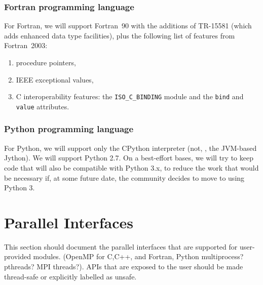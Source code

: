 \documentclass[draftmode,draftwater]{memarticle}
\begin{document}
\subsubsection{Fortran programming language}

For Fortran, we will support Fortran~90 with the additions of TR-15581
(which adds enhanced data type facilities), plus the following list of
features from Fortran~2003:
\begin{enumerate}
\item procedure pointers,
\item IEEE exceptional values,
\item C interoperability features: the \texttt{ISO\_C\_BINDING} module
  and the \texttt{bind} and \texttt{value} attributes.
\end{enumerate}

\subsubsection{Python programming language}

For Python, we will support only the CPython interpreter (not, \eg, the
JVM-based Jython). We will support Python 2.7. On a best-effort bases,
we will try to keep code that will also be compatible with Python 3.x,
to reduce the work that would be necessary if, at some future date, the
community decides to move to using Python 3.

\section{Parallel Interfaces}

This section should document the parallel interfaces that are supported for
user-provided modules.  (OpenMP for C,C++, and Fortran, Python multiprocess? pthreads? MPI threads?).
APIs that are exposed to the user should be made thread-safe or explicitly labelled
as unsafe.

\end{document}
